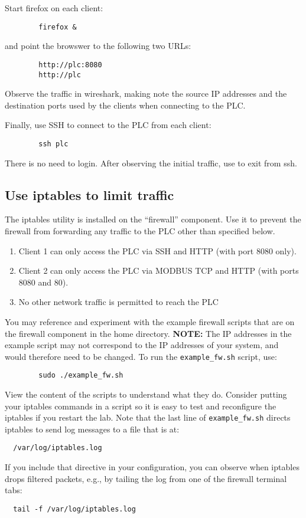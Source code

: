 \noindent Start firefox on each client:
\begin{verbatim}
        firefox &
\end{verbatim}
\noindent and point the browswer to the following two URLs:
\begin{verbatim}
        http://plc:8080
        http://plc
\end{verbatim}
\noindent Observe the traffic in wireshark, making note the
source IP addresses and the destination ports used by the 
clients when connecting to the PLC.

\noindent Finally, use SSH to connect to the PLC from each client:
\begin{verbatim}
        ssh plc
\end{verbatim}
\noindent There is no need to login.  After observing the initial traffic,
use {\tt <ctrl C>} to exit from ssh.

\subsection{Use iptables to limit traffic}
The iptables utility is installed on the ``firewall'' component.
Use it to prevent the firewall from forwarding any traffic
to the PLC other than specified below.

\begin{enumerate}
\item Client 1 can only access the PLC via SSH and HTTP 
(with port 8080 only).
\item Client 2 can only access the PLC via MODBUS TCP and HTTP 
(with ports 8080 and 80).
\item No other network traffic is permitted to reach the PLC
\end{enumerate}

You may reference and experiment with the example firewall scripts that
are on the firewall component in the home directory.  \textbf{NOTE:} The IP addresses in the example
script may not correspond to the IP addresses of your system, and would
therefore need to be changed.  To run the {\tt example\_fw.sh} script, use:
\begin{verbatim}
        sudo ./example_fw.sh
\end{verbatim}
View the content of the scripts to understand what they do.
Consider putting your iptables commands in a script so it is easy
to test and reconfigure the iptables if you restart the lab.
Note that the last line of {\tt example\_fw.sh} directs iptables
to send log messages to a file that is at:
\begin{verbatim}
  /var/log/iptables.log
\end{verbatim}
\noindent If you include that directive in your configuration, you can observe when
iptables drops filtered packets, e.g., by tailing the log from one of the 
firewall terminal tabs:
\begin{verbatim}
  tail -f /var/log/iptables.log
\end{verbatim}

